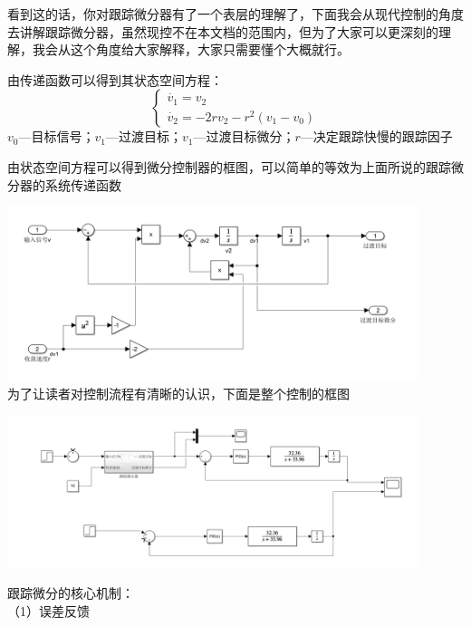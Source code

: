 \documentclass[UTF8,a4paper,12pt]{ctexart}
\begin{document}
            \begin{flushleft}
              看到这的话，你对跟踪微分器有了一个表层的理解了，下面我会从现代控制的角度去讲解跟踪微分器，虽然现控不在本文档的范围内，但为了大家可以更深刻的理解，我会从这个角度给大家解释，大家只需要懂个大概就行。
            \end{flushleft}
            
            
              由传递函数可以得到其状态空间方程：
            $$ 
            \begin{cases}
              \overset{\cdot}{v}_1=v_2\\
              \overset{\cdot}{v}_2=-2rv_2-r^2\left( v_1-v_0 \right) 
            \end{cases}$$
            $v_0$---目标信号；$v_1$---过渡目标；$v_1$---过渡目标微分；$r$---决定跟踪快慢的跟踪因子
            \begin{flushleft}
              由状态空间方程可以得到微分控制器的框图，可以简单的等效为上面所说的跟踪微分器的系统传递函数
              \par \includegraphics[width=12cm]{picture/tracking_differentiator_ss.png}\\
              为了让读者对控制流程有清晰的认识，下面是整个控制的框图
              \par \includegraphics[width=12cm]{picture/tracking_differentiator_ss_all.png}\\
              \end{flushleft}
              跟踪微分的核心机制：\\
              （1）误差反馈\\
\end{document}
